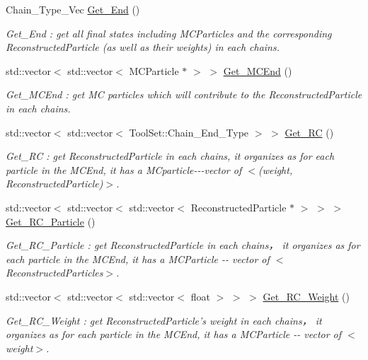 \begin{DoxyCompactItemize}
Chain\_\-Type\_\-Vec \hyperlink{classToolSet_1_1CChain__Vec_a3e682d89901496518b5bfa54533b6f59}{Get\_\-End} ()
\begin{DoxyCompactList}\small\item\em Get\_\-End : get all final states including MCParticles and the corresponding ReconstructedParticle (as well as their weights) in each chains. \item\end{DoxyCompactList}\item 
std::vector$<$ std::vector$<$ MCParticle $\ast$ $>$ $>$ \hyperlink{classToolSet_1_1CChain__Vec_ae16c3ae128fc1beec87fd41581339047}{Get\_\-MCEnd} ()
\begin{DoxyCompactList}\small\item\em Get\_\-MCEnd : get MC particles which will contribute to the ReconstructedParticle in each chains. \item\end{DoxyCompactList}\item 
std::vector$<$ std::vector$<$ ToolSet::Chain\_\-End\_\-Type $>$ $>$ \hyperlink{classToolSet_1_1CChain__Vec_a790838ea04f22624ad047e8e3f351db5}{Get\_\-RC} ()
\begin{DoxyCompactList}\small\item\em Get\_\-RC : get ReconstructedParticle in each chains, it organizes as for each particle in the MCEnd, it has a MCparticle-\/-\/-\/vector of $<$(weight, ReconstructedParticle)$>$. \item\end{DoxyCompactList}\item 
std::vector$<$ std::vector$<$ std::vector$<$ ReconstructedParticle $\ast$ $>$ $>$ $>$ \hyperlink{classToolSet_1_1CChain__Vec_a79fd8a76d1edea4876f2a1c6aaabadf2}{Get\_\-RC\_\-Particle} ()
\begin{DoxyCompactList}\small\item\em Get\_\-RC\_\-Particle : get ReconstructedParticle in each chains， it organizes as for each particle in the MCEnd, it has a MCParticle -\/-\/ vector of $<$ReconstructedParticles$>$. \item\end{DoxyCompactList}\item 
std::vector$<$ std::vector$<$ std::vector$<$ float $>$ $>$ $>$ \hyperlink{classToolSet_1_1CChain__Vec_aeb5adc8cde13c82d7727efb02241d637}{Get\_\-RC\_\-Weight} ()
\begin{DoxyCompactList}\small\item\em Get\_\-RC\_\-Weight : get ReconstructedParticle's weight in each chains， it organizes as for each particle in the MCEnd, it has a MCParticle -\/-\/ vector of $<$weight$>$. \item\end{DoxyCompactList}\item 

\end{DoxyCompactItemize}
